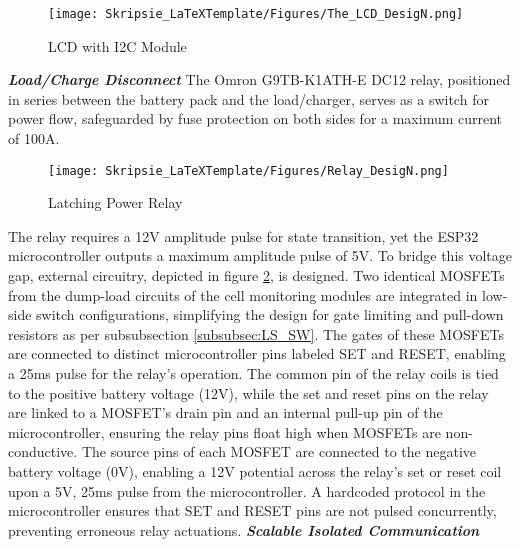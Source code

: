 \begin{figure}[h!]
\centering
\texttt{[image: Skripsie\_LaTeXTemplate/Figures/The\_LCD\_DesigN.png]}
\caption{LCD with I2C Module \cite{LCD_MR}}
\label{fig:Mstr_D3}
\end{figure}
\noindent
\textbf{\emph{Load/Charge Disconnect}}\label{subsubsec:relay_Dsgn}\newline
\noindent
The Omron G9TB-K1ATH-E DC12 relay, positioned in series between the battery pack and the load/charger, serves as a switch for power flow, safeguarded by fuse protection on both sides for a maximum current of 100A.

\begin{figure}[h!]
\centering
\texttt{[image: Skripsie\_LaTeXTemplate/Figures/Relay\_DesigN.png]}
\caption{Latching Power Relay \cite{RELAY}}
\label{fig:Mstr_D7}
\end{figure}
\noindent
The relay requires a 12V amplitude pulse for state transition, yet the ESP32 microcontroller outputs a maximum amplitude pulse of 5V. To bridge this voltage gap, external circuitry, depicted in figure \ref{fig:Mstr_D7}, is designed. Two identical MOSFETs from the dump-load circuits of the cell monitoring modules are integrated in low-side switch configurations, simplifying the design for gate limiting and pull-down resistors as per subsubsection \ref{subsubsec:LS_SW}.\newline\newline
\noindent
The gates of these MOSFETs are connected to distinct microcontroller pins labeled SET and RESET, enabling a 25ms pulse for the relay's operation. The common pin of the relay coils is tied to the positive battery voltage (12V), while the set and reset pins on the relay are linked to a MOSFET's drain pin and an internal pull-up pin of the microcontroller, ensuring the relay pins float high when MOSFETs are non-conductive.\newline\newline
\noindent
The source pins of each MOSFET are connected to the negative battery voltage (0V), enabling a 12V potential across the relay's set or reset coil upon a 5V, 25ms pulse from the microcontroller. A hardcoded protocol in the microcontroller ensures that SET and RESET pins are not pulsed concurrently, preventing erroneous relay actuations.
\newline\newline
\noindent
\textbf{\emph{Scalable Isolated Communication}}\label{subsubsec:iso_COMS_Mstr}

